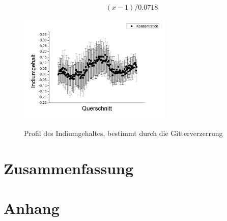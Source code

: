 \documentclass[a4paper,11pt,DIV=11]{scrartcl}
\begin{document}
\begin{align*}
	(x-1) / 0.0718
\end{align*}

\begin{figure}[h]\centering
	\includegraphics[width=0.65\textwidth]{Versuchsdaten/13/Graph01.png}
\label{hochindium}
\caption{Profil des Indiumgehaltes, bestimmt durch die Gitterverzerrung}
\end{figure}




\section{Zusammenfassung}

\section*{Anhang}
\end{document}
